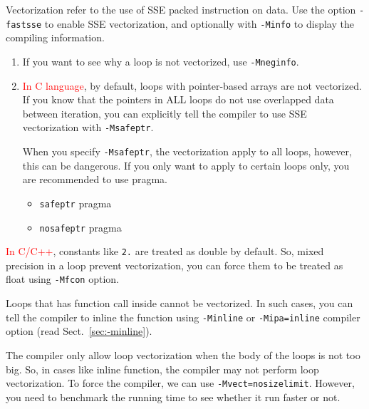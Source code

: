 Vectorization refer to the use of SSE packed instruction on data.  Use
the option \verb!-fastsse! to enable SSE vectorization, and optionally
with \verb!-Minfo! to display the compiling information. 
\begin{enumerate}
\item If you want to see why a loop is not vectorized, use
  \verb!-Mneginfo!.
\item \textcolor{red}{In C language}, by default, loops with
  pointer-based arrays are not vectorized. If you know that the
  pointers in ALL loops do not use overlapped data between iteration,
  you can explicitly tell the compiler to use SSE vectorization with
  \verb!-Msafeptr!.

  When you specify \verb!-Msafeptr!, the vectorization apply to all
  loops, however, this can be dangerous. If you only want to apply to
  certain loops only, you are recommended to use pragma.
\begin{itemize}
\item \verb!safeptr! pragma
\item \verb!nosafeptr! pragma
\end{itemize}
\end{enumerate}

\textcolor{red}{In C/C++}, constants like \verb!2.! are treated as
double by default. So, mixed precision in a loop prevent
vectorization, you can force them to be treated as float using
\verb!-Mfcon! option.

Loops that has function call inside cannot be vectorized. In such
cases, you can tell the compiler to inline the function using
\verb!-Minline! or \verb!-Mipa=inline! compiler option (read
Sect.~\ref{sec:-minline}).

The compiler only allow loop vectorization when the body of the loops
is not too big. So, in cases like inline function, the compiler may
not perform loop vectorization. To force the compiler, we can use
\verb!-Mvect=nosizelimit!. However, you need to benchmark the running
time to see whether it run faster or not. 


